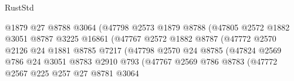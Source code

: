 \begin{lexlean}{RustStd}
\begin{coremodule}
                                        @1879
                                        @27
                                        @8788
                                        @3064
                                        (@47798
                                          @2573
                                          @1879
                                          @8788
                                          (@47805
                                            @2572
                                            @1882
                                            @3051
                                            @8787
                                            @3225
                                            @16861
                                            (@47767
                                              @2572
                                              @1882
                                              @8787
                                              (@47772
                                                @2570
                                                @2126
                                                @24
                                                @1881
                                                @8785
                                                @7217
                                                (@47798
                                                  @2570
                                                  @24
                                                  @8785
                                                  (@47824
                                                    @2569
                                                    @786
                                                    @24
                                                    @3051
                                                    @8783
                                                    @2910
                                                    @793
                                                    (@47767
                                                      @2569
                                                      @786
                                                      @8783
                                                      (@47772
                                                        @2567
                                                        @225
                                                        @257
                                                        @27
                                                        @8781
                                                        @3064

\end{coremodule}
\end{lexlean}
